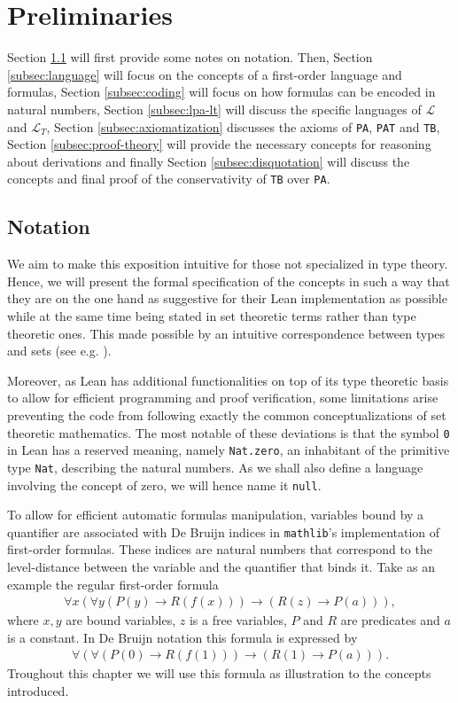 \chapter{Preliminaries}
Section \ref{subsec:notation} will first provide some notes on notation. Then, Section \ref{subsec:language} will focus on the concepts of a first-order language and formulas, Section \ref{subsec:coding} will focus on how formulas can be encoded in natural numbers, Section \ref{subsec:lpa-lt} will discuss the specific languages of $\mathcal{L}$ and $\mathcal{L}_T$, Section \ref{subsec:axiomatization} discusses the axioms of \texttt{PA}, \texttt{PAT} and \texttt{TB}, Section \ref{subsec:proof-theory} will provide the necessary concepts for reasoning about derivations and finally Section \ref{subsec:disquotation} will discuss the concepts and final proof of the conservativity of \texttt{TB} over \texttt{PA}.

\section{Notation}\label{subsec:notation}
We aim to make this exposition intuitive for those not specialized in type theory. Hence, we will present the formal specification of the concepts in such a way that they are on the one hand as suggestive for their Lean implementation as possible while at the same time being stated in set theoretic terms rather than type theoretic ones. This made possible by an intuitive correspondence between types and sets (see e.g. \cite{nederpelt:1994}).

Moreover, as Lean has additional functionalities on top of its type theoretic basis to allow for efficient programming and proof verification, some limitations arise preventing the code from following exactly the common conceptualizations of set theoretic mathematics. The most notable of these deviations is that the symbol \texttt{0} in Lean has a reserved meaning, namely \texttt{Nat.zero}, an inhabitant of the primitive type \texttt{Nat}, describing the natural numbers. As we shall also define a language involving the concept of zero, we will hence name it \texttt{null}.

To allow for efficient automatic formulas manipulation, variables bound by a quantifier are associated with De Bruijn \cite{bruijn:1972} indices in \texttt{mathlib}'s implementation of first-order formulas. These indices are natural numbers that correspond to the level-distance between the variable and the quantifier that binds it. Take as an example the regular first-order formula 
\begin{align}
    \forall x (\forall y (P(y) \to R(f(x))) \to (R(z) \to P(a))),
\end{align} where $x, y$ are bound variables, $z$ is a free variables, $P$ and $R$ are predicates and $a$ is a constant.
In De Bruijn notation this formula is expressed by
\begin{align}\label{fml:db}
    \forall (\forall (P(0) \to R(f(1))) \to (R(1) \to P(a))).
\end{align}
Troughout this chapter we will use this formula as illustration to the concepts introduced.

